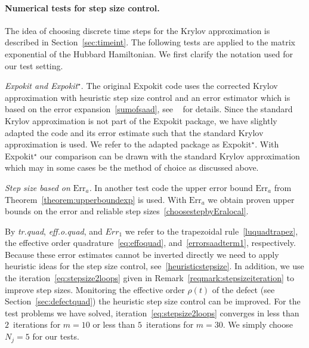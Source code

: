 \documentclass[smallextended]{svjour3pre}%
\numberwithin{equation}{section}
\numberwithin{figure}{section}
\numberwithin{table}{section}
\newcommand\tjnew[1]{{#1}}
\newcommand\Era{\mathrm{Err}_a}
\begin{document}
\paragraph{Numerical tests for step size control.}
The idea of choosing discrete time steps for the Krylov approximation is described in Section~\ref{sec:timeint}.
The following tests are applied to the matrix exponential of the Hubbard Hamiltonian.
We first clarify the notation used for our test setting.
\begin{description}
\item {\em Expokit and Expokit$^{\star}$}.
The original Expokit code uses the corrected Krylov approximation with heuristic step size control and an
error estimator which is based on the error expansion~\eqref{sumofsaad}, see ~\cite[Algorithm 3.2]{sidje98} for details.
Since the standard Krylov approximation is not part of the Expokit package,
we have slightly adapted the code and its error estimate such that the standard Krylov approximation is used.
We refer to the adapted package as Expokit$^{\star}$.
With Expokit$^{\star}$ our comparison can be drawn with the standard Krylov approximation
which may in some cases be the method of choice as discussed above.
\item {\em Step size based on $\Era$.} In another test code the \tjnew{upper error bound} $\Era$ from Theorem~\ref{theorem:upperboundexp} is used.
With $\Era$ we obtain \tjnew{proven} upper bounds on the error and reliable step sizes~\eqref{choosestepbyEralocal}.
\item By {\em tr.quad}, {\em eff.o.quad}, and {$\mathit{Err}_1$} we refer to
the trapezoidal rule~\eqref{luquadtrapez}, the effective order quadrature~\eqref{eq:effoquad}, and~\eqref{errorsaadterm1}, respectively.
Because these error estimates cannot be inverted directly we need to apply heuristic ideas for the step size control, see~\eqref{heuristicstepsize}.
In addition, we use the iteration~\eqref{eq:stepsize2loops} given in Remark~\ref{reqmark:stepsizeiteration} to improve step sizes.
Monitoring the effective order $\rho(t)$ of the defect (see Section~\ref{sec:defectquad}) the heuristic step size control can be improved.
For the test problems we have solved, iteration~\eqref{eq:stepsize2loops}
converges in less than $2$~iterations for $m=10$ or less than $5$~iterations for $m=30$.
We simply choose $N_j=5$ for our tests.

\end{description}
\end{document}
